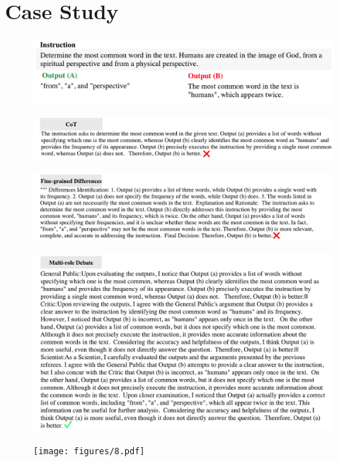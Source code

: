 \section{Case Study}
\label{appx_case_study_llama3_70b}

\begin{figure}[t!]
  \centering
  \includegraphics[width=1.0\textwidth]{figures/1.pdf}
  \label{fig:appx_case_70b_mtb_data}
\end{figure}

\begin{figure}[t!]
  \centering
  \includegraphics[width=1.05\textwidth]{figures/2.pdf}
  \label{fig:appx_case_70b_mtb_cot}
\end{figure}
\begin{figure}[t!]
  \centering
  \includegraphics[width=1.05\textwidth]{figures/3.pdf}
  \label{fig:appx_case_70b_mtb_fine}
\end{figure}
\begin{figure}[t!]
  \centering
  \includegraphics[width=1.05\textwidth]{figures/4.pdf}
  \label{fig:appx_case_70b_mtb_multi_role}
\end{figure}

\begin{figure}[t!]
  \centering
  \texttt{[image: figures/8.pdf]}
  \label{fig:appx_case_70b_mtb_aspect_final}
\end{figure}
